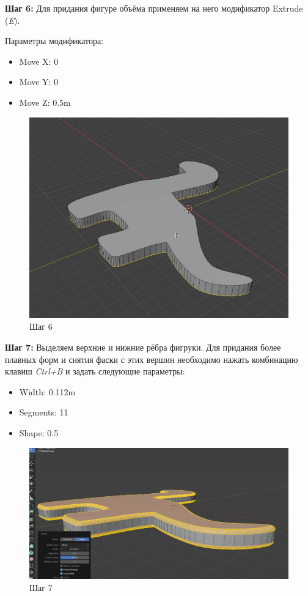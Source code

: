 \documentclass[areasetadvanced]{scrartcl}
\begin{document}
\par \textbf{Шаг 6:} Для придания фигуре объёма применяем на него модификатор Extrude (\textit{E}).
\par Параметры модификатора:
\begin{itemize}
    \item Move X: 0
    \item Move Y: 0
    \item Move Z: 0.5m
\end{itemize}
\begin{figure}[H]
    \label{4} 
    \centering
    \includegraphics[width=0.6\linewidth]{dino/6.png}
    \caption{Шаг 6}
\end{figure}

\par \textbf{Шаг 7:} Выделяем верхние и нижние рёбра фигруки. Для придания более плавных форм и снятия фаски с этих вершин необходимо нажать комбинацию клавиш \textit{Ctrl+B} и задать следующие параметры:
\begin{itemize}
    \item Width: 0.112m
    \item Segments: 11
    \item Shape: 0.5
\end{itemize}
\begin{figure}[H]
    \label{4} 
    \centering
    \includegraphics[width=0.8\linewidth]{dino/7.png}
    \caption{Шаг 7}
\end{figure}
\end{document}
